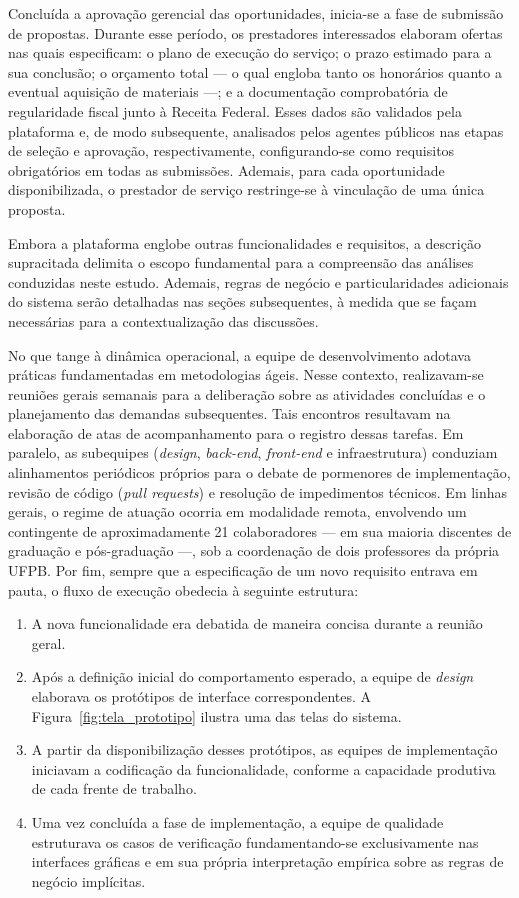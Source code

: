 Concluída a aprovação gerencial das oportunidades, inicia-se a fase de submissão de propostas. Durante esse período, os prestadores interessados elaboram ofertas nas quais especificam: o plano de execução do serviço; o prazo estimado para a sua conclusão; o orçamento total --- o qual engloba tanto os honorários quanto a eventual aquisição de materiais ---; e a documentação comprobatória de regularidade fiscal junto à Receita Federal. Esses dados são validados pela plataforma e, de modo subsequente, analisados pelos agentes públicos nas etapas de seleção e aprovação, respectivamente, configurando-se como requisitos obrigatórios em todas as submissões. Ademais, para cada oportunidade disponibilizada, o prestador de serviço restringe-se à vinculação de uma única proposta.

Embora a plataforma englobe outras funcionalidades e requisitos, a descrição supracitada delimita o escopo fundamental para a compreensão das análises conduzidas neste estudo. Ademais, regras de negócio e particularidades adicionais do sistema serão detalhadas nas seções subsequentes, à medida que se façam necessárias para a contextualização das discussões.

No que tange à dinâmica operacional, a equipe de desenvolvimento adotava práticas fundamentadas em metodologias ágeis. Nesse contexto, realizavam-se reuniões gerais semanais para a deliberação sobre as atividades concluídas e o planejamento das demandas subsequentes. Tais encontros resultavam na elaboração de atas de acompanhamento para o registro dessas tarefas. Em paralelo, as subequipes (\textit{design}, \textit{back-end}, \textit{front-end} e infraestrutura) conduziam alinhamentos periódicos próprios para o debate de pormenores de implementação, revisão de código (\textit{pull requests}) e resolução de impedimentos técnicos. Em linhas gerais, o regime de atuação ocorria em modalidade remota, envolvendo um contingente de aproximadamente 21 colaboradores --- em sua maioria discentes de graduação e pós-graduação ---, sob a coordenação de dois professores da própria UFPB. Por fim, sempre que a especificação de um novo requisito entrava em pauta, o fluxo de execução obedecia à seguinte estrutura:

\begin{enumerate}[topsep=0em, itemsep=0.3em]
   \item A nova funcionalidade era debatida de maneira concisa durante a reunião geral.
   \item Após a definição inicial do comportamento esperado, a equipe de \textit{design} elaborava os protótipos de interface correspondentes. A Figura~\ref{fig:tela_prototipo} ilustra uma das telas do sistema.
   \item A partir da disponibilização desses protótipos, as equipes de implementação iniciavam a codificação da funcionalidade, conforme a capacidade produtiva de cada frente de trabalho.
   \item Uma vez concluída a fase de implementação, a equipe de qualidade estruturava os casos de verificação fundamentando-se exclusivamente nas interfaces gráficas e em sua própria interpretação empírica sobre as regras de negócio implícitas.
\end{enumerate}

